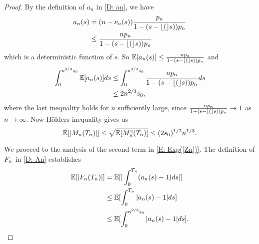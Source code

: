 \begin{proof}
	By the definition of $a_n$ in \eqref{D: an}, we have
	\begin{equation}
	\begin{aligned}
	a_n(s) &= (n - \nu_n(s)) \frac{p_n}{1 - (s - \lfloor(\rfloor s))p_n} \\
	&\leq \frac{n p_n}{1 - (s - \lfloor(\rfloor s))p_n}
	\end{aligned}
	\end{equation}
	which is a deterministic function of $s$. So
	$ \mathbb{E}[a_n(s)] \leq \frac{n p_n}{1 - (s - \lfloor(\rfloor s))p_n} $
	and
	\begin{equation}
	\begin{aligned}
	\int_{0}^{n^{2 / 3}s_0} \mathbb{E}[a_n(s)] ds 
	&\leq \int_{0}^{n^{2 / 3}s_0}\frac{n p_n}{1 - (s - \lfloor(\rfloor s))p_n}ds \\
	&\leq 2n^{2 / 3}s_0,
	\end{aligned}
	\end{equation}
	where the last inequality holds for $n$ sufficiently large, since 
	$\frac{n p_n}{1 - (s - \lfloor(\rfloor s))p_n} \rightarrow 1$
	as $n \rightarrow \infty$.
	Now Hölders inequality gives us
	\begin{equation} \label{E: Exp(Mn)}
	\mathbb{E}[|M_n(T_n)|] \leq \sqrt{\mathbb{E}[M^2_n(T_n)]} \leq (2s_0)^{1/2}n^{1 / 3}.
	\end{equation}
	
	We proceed to the analysis of the second term in \eqref{E: Exp(|Zn|)}.
	The definition of $F_n$ in \eqref{D: An} establishes
	\begin{equation}
	\begin{aligned}
	\mathbb{E}[|F_n(T_n)|] 
	&= \mathbb{E}[|\int_{0}^{T_n}(a_n(s) -1)ds |] \\
	&\leq \mathbb{E}[\int_{0}^{T_n} |a_n(s)-1|ds] \\
	&\leq \mathbb{E}[\int_{0}^{n^{2 / 3}s_0} |a_n(s)-1|ds].
	\end{aligned}
	\end{equation}
	

\end{proof}
